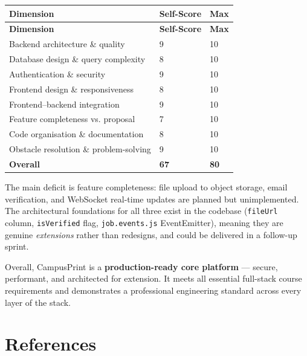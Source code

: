 \documentclass[12pt,a4paper]{report}
\begin{document}
\begin{longtable}{L{6cm} C{2.5cm} C{2.5cm}}
  \toprule
  \textbf{Dimension} & \textbf{Self-Score} & \textbf{Max} \\
  \midrule
  \endfirsthead
  \midrule
  \textbf{Dimension} & \textbf{Self-Score} & \textbf{Max} \\
  \midrule
  \endhead
  \bottomrule
  \endfoot
  Backend architecture \& quality          & 9 & 10 \\
  Database design \& query complexity      & 8 & 10 \\
  Authentication \& security               & 9 & 10 \\
  Frontend design \& responsiveness        & 8 & 10 \\
  Frontend–backend integration             & 9 & 10 \\
  Feature completeness vs. proposal        & 7 & 10 \\
  Code organisation \& documentation       & 8 & 10 \\
  Obstacle resolution \& problem-solving   & 9 & 10 \\
  \midrule
  \textbf{Overall}                         & \textbf{67} & \textbf{80} \\
  \bottomrule
\end{longtable}

\noindent The main deficit is feature completeness: file upload to object storage, email
verification, and WebSocket real-time updates are planned but unimplemented. The
architectural foundations for all three exist in the codebase (\texttt{fileUrl} column,
\texttt{isVerified} flag, \texttt{job.events.js} EventEmitter), meaning they are genuine
\emph{extensions} rather than redesigns, and could be delivered in a follow-up sprint.

\vspace{1cm}
\noindent Overall, CampusPrint is a \textbf{production-ready core platform} — secure,
performant, and architected for extension. It meets all essential full-stack course
requirements and demonstrates a professional engineering standard across every layer of the
stack.

\clearpage

\chapter*{References}
\end{document}
